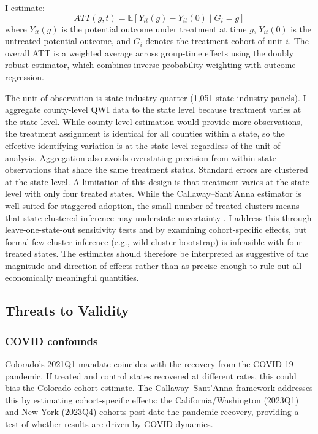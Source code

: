 \documentclass[12pt]{article}
\newcommand{\E}{\mathbb{E}}
\begin{document}
I estimate:
\begin{equation}
ATT(g,t) = \E[Y_{it}(g) - Y_{it}(0) \mid G_i = g]
\end{equation}
where $Y_{it}(g)$ is the potential outcome under treatment at time $g$, $Y_{it}(0)$ is the untreated potential outcome, and $G_i$ denotes the treatment cohort of unit $i$. The overall ATT is a weighted average across group-time effects using the \citet{callaway2021difference} doubly robust estimator, which combines inverse probability weighting with outcome regression.

The unit of observation is state-industry-quarter (1,051 state-industry panels). I aggregate county-level QWI data to the state level because treatment varies at the state level. While county-level estimation would provide more observations, the treatment assignment is identical for all counties within a state, so the effective identifying variation is at the state level regardless of the unit of analysis. Aggregation also avoids overstating precision from within-state observations that share the same treatment status. Standard errors are clustered at the state level. A limitation of this design is that treatment varies at the state level with only four treated states. While the Callaway--Sant'Anna estimator is well-suited for staggered adoption, the small number of treated clusters means that state-clustered inference may understate uncertainty \citep{rambachan2023more}. I address this through leave-one-state-out sensitivity tests and by examining cohort-specific effects, but formal few-cluster inference (e.g., wild cluster bootstrap) is infeasible with four treated states. The estimates should therefore be interpreted as suggestive of the magnitude and direction of effects rather than as precise enough to rule out all economically meaningful quantities.

\subsection{Threats to Validity}

\subsubsection*{COVID confounds} Colorado's 2021Q1 mandate coincides with the recovery from the COVID-19 pandemic. If treated and control states recovered at different rates, this could bias the Colorado cohort estimate. The Callaway--Sant'Anna framework addresses this by estimating cohort-specific effects: the California/Washington (2023Q1) and New York (2023Q4) cohorts post-date the pandemic recovery, providing a test of whether results are driven by COVID dynamics.
\end{document}
